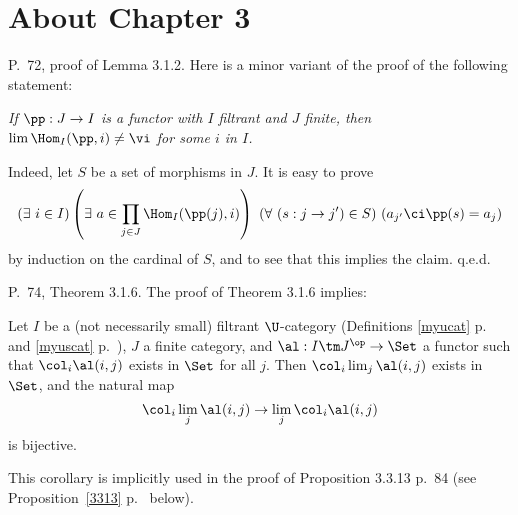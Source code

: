\documentclass[12pt]{article}
\theoremstyle{remark}
\theoremstyle{definition}
\begin{document}

\section{About Chapter 3}


\begin{s} 
P.~72, proof of Lemma 3.1.2. Here is a minor variant of the proof of the following statement: 

\emph{If $\pp:J\to I$ is a functor with $I$ filtrant and $J$ finite, then $\lim\Hom_I(\pp,i)\neq\vi$ for some $i$ in $I$.} 

Indeed, let $S$ be a set of morphisms in $J$. It is easy to prove 
$$
(\exists\ i\in I)\left(\exists\ a\in\prod_{j\in J}\Hom_I(\pp(j),i)\right)\ (\forall\ (s:j\to j')\in S)\ (a_{j'}\ci\pp(s)=a_j) 
$$ 
by induction on the cardinal of $S$, and to see that this implies the claim. q.e.d.
\end{s}


\begin{s} 
P.~74, Theorem 3.1.6. The proof of Theorem 3.1.6 implies: 
\begin{prop}
Let $I$ be a (not necessarily small) filtrant $\U$-category (Definitions \ref{myucat} p.~ and \ref{myuscat} p.~), $J$ a finite category, and $\al:I\tm J^{\op}\to\Set$ a functor such that $\col_i\al(i,j)$ exists in $\Set$ for all $j$. Then $\col_i\lim_j\al(i,j)$ exists in $\Set$, and the natural map 
$$
\col_i\lim_j\al(i,j)\to
\lim_j\col_i\al(i,j)
$$ 
is bijective. 
\end{prop} 
This corollary is implicitly used in the proof of Proposition 3.3.13 p.~84 (see Proposition~\ref{3313} p.~ below).
\end{s}

%
\end{document}
